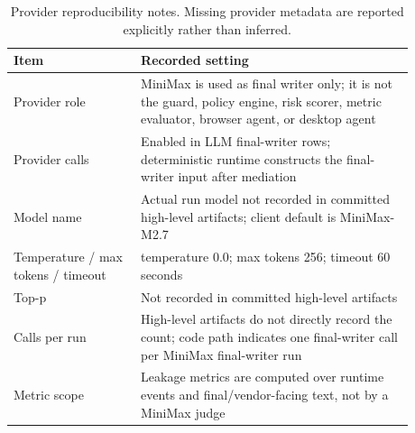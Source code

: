 \begin{table}[H]
\centering
\footnotesize
\setlength{\tabcolsep}{3pt}
\renewcommand{\arraystretch}{1.06}
\begin{tabular}{p{0.28\linewidth}p{0.60\linewidth}}
\toprule
Item & Recorded setting \\
\midrule
Provider role & MiniMax is used as final writer only; it is not the guard, policy engine, risk scorer, metric evaluator, browser agent, or desktop agent \\
Provider calls & Enabled in LLM final-writer rows; deterministic runtime constructs the final-writer input after mediation \\
Model name & Actual run model not recorded in committed high-level artifacts; client default is MiniMax-M2.7 \\
Temperature / max tokens / timeout & temperature 0.0; max tokens 256; timeout 60 seconds \\
Top-p & Not recorded in committed high-level artifacts \\
Calls per run & High-level artifacts do not directly record the count; code path indicates one final-writer call per MiniMax final-writer run \\
Metric scope & Leakage metrics are computed over runtime events and final/vendor-facing text, not by a MiniMax judge \\
\bottomrule
\end{tabular}
\caption{Provider reproducibility notes. Missing provider metadata are reported explicitly rather than inferred.}
\label{tab:provider_config}
\end{table}

